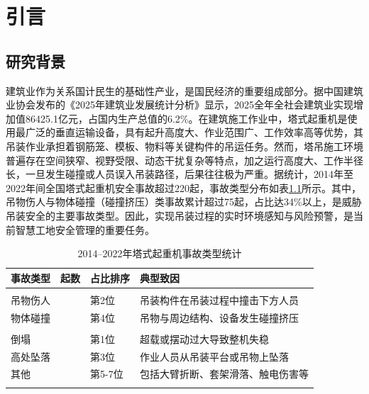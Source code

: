 ﻿\chapter{引言}\label{ux5f15ux8a00}

\section{研究背景}\label{ux7814ux7a76ux80ccux666f}

建筑业作为关系国计民生的基础性产业，是国民经济的重要组成部分。据中国建筑业协会发布的《2025年建筑业发展统计分析》显示，2025全年全社会建筑业实现增加值86425.1亿元，占国内生产总值的6.2\%\cite{E78S579E}。在建筑施工作业中，塔式起重机是使用最广泛的垂直运输设备，具有起升高度大、作业范围广、工作效率高等优势\cite{G8HEXPSB,3LHPNGFB,CSVHSWVZ}，其吊装作业承担着钢筋笼、模板、物料等关键构件的吊运任务。然而，塔吊施工环境普遍存在空间狭窄、视野受限、动态干扰复杂等特点，加之运行高度大、工作半径长，一旦发生碰撞或人员误入吊装路径，后果往往极为严重。据统计，2014年至2022年间全国塔式起重机安全事故超过220起\cite{KWVSPS3W}，事故类型分布如表\ref{tab:accident_distribution}所示。其中，吊物伤人与物体碰撞（碰撞挤压）类事故累计超过75起，占比达34\%以上，是威胁吊装安全的主要事故类型。因此，实现吊装过程的实时环境感知与风险预警，是当前智慧工地安全管理的重要任务。

\begin{table}[htbp]
\centering
\caption{2014--2022年塔式起重机事故类型统计\cite{KWVSPS3W}}
\label{tab:accident_distribution}
\begin{tabular*}{\textwidth}{@{\extracolsep{\fill}}>{\centering\arraybackslash}m{2.5cm}>{\centering\arraybackslash}m{1.8cm}>{\centering\arraybackslash}m{2.0cm}>{\centering\arraybackslash}m{6.5cm}}
\Xhline{1pt}
\textbf{事故类型} & \textbf{起数} & \textbf{占比排序} & \textbf{典型致因} \\
\hline
\multicolumn{4}{l}{\textbf{吊装碰撞直接相关事故}} \\
\Xhline{0.5pt}
吊物伤人 & 54 & 第2位 & 吊装构件在吊装过程中撞击下方人员 \\
物体碰撞 & 21 & 第4位 & 吊物与周边结构、设备发生碰撞挤压 \\
\hline
\multicolumn{4}{l}{\textbf{其他事故类型}} \\
\Xhline{0.5pt}
倒塌 & 79 & 第1位 & 超载或摆动过大导致整机失稳 \\
高处坠落 & 52 & 第3位 & 作业人员从吊装平台或吊物上坠落 \\
其他 & 14 & 第5-7位 & 包括大臂折断、套架滑落、触电伤害等 \\
\Xhline{1pt}
\end{tabular*}
\end{table}

